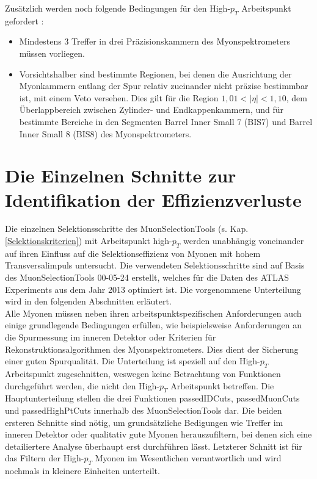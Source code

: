 Zusätzlich werden noch folgende Bedingungen für den High-$p_{T}$ Arbeitspunkt gefordert \cite{MuPerNeu}:
\begin{itemize}
  \item Mindestens 3 Treffer in drei Präzisionskammern des Myonspektrometers müssen vorliegen.
  \item Vorsichtshalber sind bestimmte Regionen, bei denen die Ausrichtung der Myonkammern entlang der Spur relativ zueinander nicht präzise bestimmbar ist, mit einem Veto versehen. Dies gilt für die Region $1{,}01<|\eta|<1{,}10$, dem Überlappbereich zwischen Zylinder- und Endkappenkammern, und für bestimmte Bereiche in den Segmenten Barrel Inner Small 7 (BIS7) und Barrel Inner Small 8 (BIS8) des Myonspektrometers. 
\end{itemize}
\section{Die Einzelnen Schnitte zur Identifikation der Effizienzverluste}\label{einzelneSchnitte}%
Die einzelnen Selektionsschritte des MuonSelectionTools (s. Kap. \ref{Selektionskriterien}) mit Arbeits\-punkt high-$p_T$ werden unabhängig voneinander auf ihren Einfluss auf die Selektionseffizienz von Myonen mit hohem Transversalimpuls untersucht. Die verwendeten Selektionsschritte sind auf Basis des MuonSelectionTools 00-05-24 erstellt, wel\-ches für die Daten des ATLAS Experiments aus dem Jahr 2013 optimiert ist. Die vorgenommene Unterteilung wird in den folgenden Abschnitten erläutert.\\
Alle Myonen müssen neben ihren arbeitspunktspezifischen Anforderungen auch einige grundlegende Bedingungen erfüllen, wie beispielsweise Anforderungen an die Spurmessung im inneren Detektor oder Kriterien für Rekonstruktionsalgorithmen des Myonspektrometers. Dies dient der Sicherung einer guten Spurqualität. 
Die Unterteilung ist speziell auf den High-$p_{T}$ Arbeitspunkt zugeschnitten, weswegen keine Betrachtung von Funktionen durchgeführt werden, die nicht den High-$p_{T}$ Arbeitspunkt be\-tref\-fen. Die Hauptunterteilung stellen die drei Funktionen passedIDCuts, passedMuonCuts und passedHighPtCuts innerhalb des MuonSelectionTools dar. Die beiden ersteren Schnitte sind nötig, um grundsätzliche Bedigungen wie Treffer im inneren Detektor oder qualitativ gute Myonen herauszufiltern, bei denen sich eine detailiertere Analyse überhaupt erst durchführen lässt. Letzterer Schnitt ist für das Filtern der High-$p_{T}$ Myonen im Wesentlichen verantwortlich und wird nochmals in kleinere Einheiten unterteilt. 

